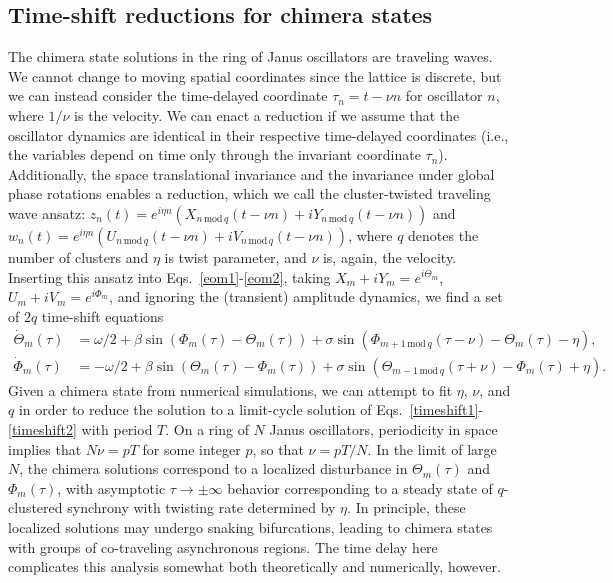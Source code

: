 \documentclass[aps,pre,amsmath,amssymb,floatfix,onecolumn,notitlepage,10pt]{revtex4-1}
\begin{document}
\subsection{Time-shift reductions for chimera states}
The chimera state solutions in the ring of Janus oscillators are traveling waves. We cannot change to moving spatial coordinates since the lattice is discrete, but we can instead consider the time-delayed coordinate $\tau_n = t - \nu n$ for oscillator $n$, where $1/\nu$ is the velocity. We can enact a reduction if we assume that the oscillator dynamics are identical in their respective time-delayed coordinates (i.e., the variables depend on time only through the invariant coordinate $\tau_n$). Additionally, the space translational invariance and the invariance under global phase rotations enables a reduction, which we call the cluster-twisted traveling wave ansatz: $z_n(t) = e^{i\eta n}\left(X_{n\,\text{mod}\,q}(t-\nu n)+iY_{n\,\text{mod}\,q}(t-\nu n)\right)$ and $w_n(t) = e^{i\eta n}\left(U_{n\,\text{mod}\,q}(t-\nu n)+iV_{n\,\text{mod}\,q}(t-\nu n)\right)$, where $q$ denotes the number of clusters and $\eta$ is twist parameter, and $\nu$ is, again, the velocity.  Inserting this ansatz into Eqs.~\eqref{eom1}-\eqref{eom2}, taking $X_m + iY_m = e^{i\Theta_m}$, $U_m+iV_m=e^{i\Phi_m}$, and ignoring the (transient) amplitude dynamics, we find a set of $2q$ time-shift equations
\begin{align}
\dot{\Theta}_m(\tau) &= \omega/2 + \beta\sin(\Phi_m(\tau)-\Theta_m(\tau)) + \sigma\sin(\Phi_{m+1\, \text{mod}\, q}(\tau-\nu) -\Theta_m(\tau)-\eta), \label{timeshift1} \\
\dot{\Phi}_m(\tau) &= -\omega/2 + \beta\sin(\Theta_m(\tau)-\Phi_m(\tau)) + \sigma\sin(\Theta_{m-1\, \text{mod}\, q}(\tau+\nu) -\Phi_m(\tau)+\eta). \label{timeshift2}
\end{align}
Given a chimera state from numerical simulations, we can attempt to fit $\eta$, $\nu$, and $q$ in order to reduce the solution to a limit-cycle solution of Eqs.~\eqref{timeshift1}-\eqref{timeshift2} with period $T$. On a ring of $N$ Janus oscillators, periodicity in space implies that $N\nu = p T$ for some integer $p$, so that $\nu = pT/N$. In the limit of large $N$, the chimera solutions correspond to a localized disturbance in $\Theta_m(\tau)$ and $\Phi_m(\tau)$, with asymptotic $\tau \to \pm \infty$ behavior corresponding to a steady state of $q$-clustered synchrony with twisting rate determined by $\eta$. In principle, these localized solutions may undergo snaking bifurcations, leading to chimera states with groups of co-traveling asynchronous regions. The time delay here complicates this analysis somewhat both theoretically and numerically, however.
\end{document}
